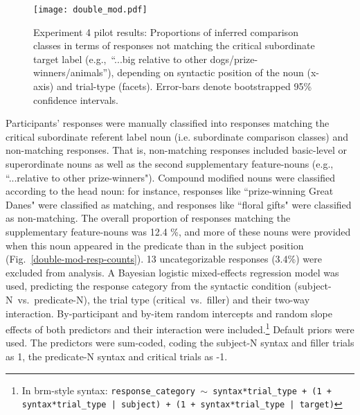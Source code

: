 \begin{figure*}[h]
	\begin{center}
		\texttt{[image: double\_mod.pdf]}
	\end{center}
	\vspace{-0.3cm}
	\caption{Experiment 4 pilot results: Proportions of inferred comparison classes in terms of responses not matching the critical subordinate target label (e.g.,~“...big relative to other dogs/prize-winners/animals”), depending on syntactic position of the noun (x-axis) and trial-type (facets). Error-bars denote bootstrapped 95\% confidence intervals.}
	\label{double-mod-results}
\end{figure*}


Participants' responses were manually classified into responses matching the critical subordinate referent label noun (i.e. subordinate comparison classes) and non-matching responses. That is, non-matching responses included basic-level or superordinate nouns as well as the second supplementary feature-nouns (e.g., ``...relative to other prize-winners"). Compound modified nouns were classified according to the head noun: for instance, responses like ``prize-winning Great Danes" were classified as matching, and responses like ``floral gifts" were classified as non-matching. The overall proportion of responses matching the supplementary feature-nouns was 12.4 \%, and more of these nouns were provided when this noun appeared in the predicate than in the subject position (Fig.~\ref{double-mod-resp-counts}). 
13 uncategorizable responses (3.4\%) were excluded from analysis. 
A Bayesian logistic mixed-effects regression model was used, predicting the response category from the syntactic condition (subject-N~vs.~predicate-N), the trial type (critical~vs.~filler) and their two-way interaction. By-participant and by-item random intercepts and random slope effects of both predictors and their interaction were included.\footnote{In brm-style syntax: \texttt{response\_category $\sim$ syntax*trial\_type + (1 + syntax*trial\_type | subject) + (1 + syntax*trial\_type | target)}}  
Default priors were used. The predictors were sum-coded, coding the subject-N syntax and filler trials as 1, the predicate-N syntax and critical trials as -1.%

